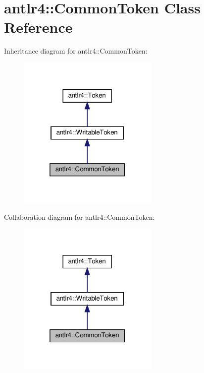 \hypertarget{classantlr4_1_1CommonToken}{}\section{antlr4\+:\+:Common\+Token Class Reference}
\label{classantlr4_1_1CommonToken}


Inheritance diagram for antlr4\+:\+:Common\+Token\+:
\nopagebreak
\begin{figure}[H]
\begin{center}
\leavevmode
\includegraphics[width=193pt]{classantlr4_1_1CommonToken__inherit__graph}
\end{center}
\end{figure}


Collaboration diagram for antlr4\+:\+:Common\+Token\+:
\nopagebreak
\begin{figure}[H]
\begin{center}
\leavevmode
\includegraphics[width=193pt]{classantlr4_1_1CommonToken__coll__graph}
\end{center}
\end{figure}
